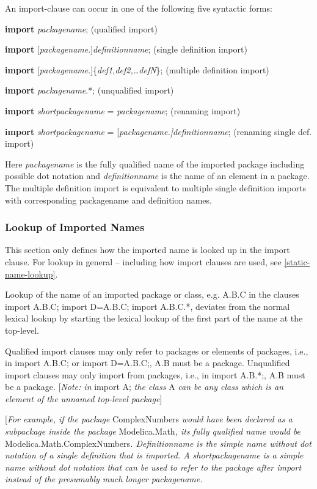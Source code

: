 \documentclass[10pt,a4paper]{report}
\def\doublelabel#1{\label{#1}}
\begin{document}
An import-clause can occur in one of the following five syntactic forms:

\textbf{import} \emph{packagename}; (qualified import)

\textbf{import} {[}\emph{packagename}.{]}\emph{definitionname}; (single
definition import)

\textbf{import}
{[}\emph{packagename}.{]}\{\emph{def1,def2,\ldots{}defN}\}; (multiple
definition import)

\textbf{import} \emph{packagename}.*; (unqualified import)

\textbf{import} \emph{shortpackagename} = \emph{packagename}; (renaming
import)

\textbf{import} \emph{shortpackagename} =
{[}\emph{packagename.{]}definitionname}; (renaming single def. import)

Here \emph{packagename} is the fully qualified name of the imported
package including possible dot notation and \emph{definitionname} is the
name of an element in a package. The multiple definition import is
equivalent to multiple single definition imports with corresponding
packagename and definition names.

\subsubsection{Lookup of Imported Names}\doublelabel{lookup-of-imported-names}

This section only defines how the imported name is looked up in the
import clause. For lookup in general -- including how import clauses are
used, see \ref{static-name-lookup}.

Lookup of the name of an imported package or class, e.g. A.B.C in the
clauses import A.B.C; import D=A.B.C; import A.B.C.*, deviates from the
normal lexical lookup by starting the lexical lookup of the first part
of the name at the top-level.

Qualified import clauses may only refer to packages or elements of
packages, i.e., in import A.B.C; or import D=A.B.C;, A.B must be a
package. Unqualified import clauses may only import from packages, i.e.,
in import A.B.*;, A.B must be a package. {[}\emph{Note: in} import A;
\emph{the class} A \emph{can be any class which is an element of the
unnamed top-level package}{]}

{[}\emph{For example, if the package} ComplexNumbers \emph{would have
been declared as a subpackage inside the package} Modelica.Math\emph{,
its fully qualified name would be} Modelica.Math.ComplexNumbers\emph{.
Definitionname is the simple name without dot notation of a single
definition that is imported. A shortpackagename is a simple name without
dot notation that can be used to refer to the package after import
instead of the presumably much longer packagename.}
\end{document}

